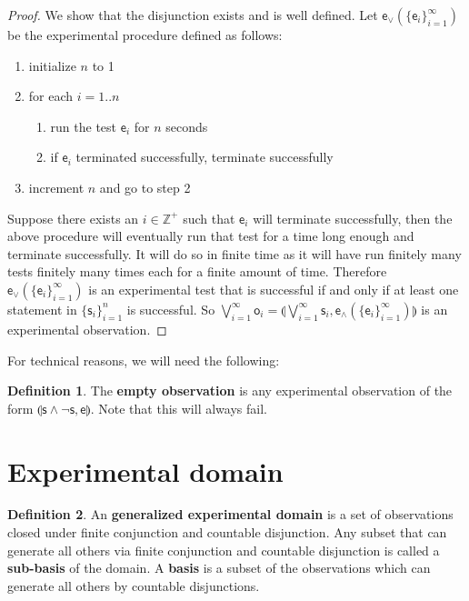 \documentclass[review]{elsarticle}
\theoremstyle{plain}%
\theoremstyle{definition}
\newtheorem{defn}{Definition}[section]
\theoremstyle{remark}
\begin{document}
\begin{proof}
	We show that the disjunction exists and is well defined. Let $\mathsf{e}_\vee(\{\mathsf{e}_i\}_{i=1}^{\infty})$ be the experimental procedure defined as follows:
	\begin{enumerate}
	\item initialize $n$ to 1
	\item for each $i=1..n$
	\begin{enumerate}
		\item run the test $\mathsf{e}_i$ for $n$ seconds
		\item if $\mathsf{e}_i$ terminated successfully, terminate successfully
	\end{enumerate}
	\item increment $n$ and go to step 2
	\end{enumerate}
	Suppose there exists an $i \in \mathbb{Z}^+$ such that $\mathsf{e}_i$ will terminate successfully, then the above procedure will eventually run that test for a time long enough and terminate successfully. It will do so in finite time as it will have run finitely many tests finitely many times each for a finite amount of time. Therefore $\mathsf{e}_\vee(\{\mathsf{e}_i\}_{i=1}^{\infty})$ is an experimental test that is successful if and only if at least one statement in $\{\mathsf{s}_i\}_{i=1}^{n}$ is successful. So $\bigvee\limits_{i=1}^{\infty} \mathsf{o}_i =\llparenthesis\bigvee\limits_{i=1}^{\infty} \mathsf{s}_i, \mathsf{e}_{\wedge}(\{\mathsf{e}_i\}_{i=1}^{\infty})\rrparenthesis$ is an experimental observation.
\end{proof}



For technical reasons, we will need the following: 

\begin{defn}
The \textbf{empty observation} is any experimental observation of the form $\llparenthesis \mathsf{s}\wedge \neg\mathsf{s},\mathsf{e}\rrparenthesis$. Note that this will always fail. 
\end{defn}



\section{Experimental domain}

\begin{defn}
	An \textbf{generalized experimental domain} is a set of observations closed under finite conjunction and countable disjunction. Any subset that can generate all others via finite conjunction and countable disjunction is called a \textbf{sub-basis} of the domain. A \textbf{basis} is a subset of the observations which can generate all others by countable disjunctions. 
\end{defn}
\end{document}
